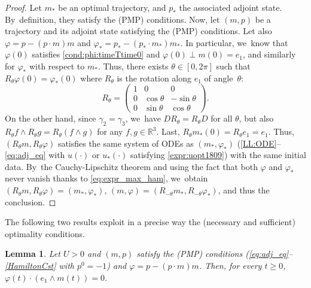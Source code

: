 \documentclass[JEP,XML,SOM,Unicode,NoEqCountersInSection,NoFloatCountersInSection,published]{cedram}
\newtheorem{lemma}[theorem]{Lemma}
\theoremstyle{definition}
\begin{document}
\begin{proof}
Let $m_*$ be an optimal trajectory, and $p_*$ the associated adjoint state. By~definition, they satisfy the (PMP) conditions. Now, let $(m, p)$ be a trajectory and its adjoint state satisfying the (PMP) conditions. Let also $\varphi = p - (p \cdot m) m$ and $\varphi_* = p_* - (p_* \cdot m_*) m_*$. In particular, we~know that $\varphi (0)$ satisfies \eqref{cond:phi:timeTtime0} and $\varphi (0) \perp m (0) = e_1$, and similarly for $\varphi_*$ with respect to $m_*$. Thus, there exists $\theta \in [0, 2 \pi]$ such that $R_\theta \varphi (0) = \varphi_* (0)$ where $R_\theta$ is the rotation along $e_1$ of angle~$\theta$:
\begin{equation*}
R_\theta =
\begin{pmatrix}
1 & 0 & 0 \\
0 & \cos \theta & - \sin \theta \\
0 & \sin \theta & \cos \theta
\end{pmatrix}.
\end{equation*}
On the other hand, since $\gamma_2 = \gamma_3$, we~have $D R_\theta = R_\theta D$ for all $\theta$, but also $R_\theta f \wedge R_\theta g = R_\theta (f \wedge g)$ for any $f, g \in \mathbb{R}^3$. Last, $R_\theta m_* (0) = R_\theta e_1 = e_1$. Thus, $(R_\theta m, R_\theta \varphi)$ satisfies the same system of ODEs as $(m_*, \varphi_*)$ (\ie \eqref{LL:ODE}--\eqref{eq:adj_eq} with $u (\cdot)$ or $u_* (\cdot)$ satisfying \eqref{expr:uopt1809}) with the same initial data. By~the Cauchy-Lipschitz theorem and using the fact that both $\varphi$ and $\varphi_*$ never vanish thanks to \eqref{eq:expr_max_ham}, we~obtain $(R_\theta m, R_\theta \varphi) = (m_*, \varphi_*)$, \ie $(m, \varphi) = (R_{- \theta} m_*, R_{- \theta} \varphi_*)$, and thus the conclusion.
\end{proof}

The following two results exploit in a precise way the (necessary and sufficient) optimality conditions.

\begin{lemma} \label{lem:adjoint_dir}
Let $U > 0$ and $(m, p)$ satisfy the (PMP) conditions (\eqref{eq:adj_eq}--\eqref{HamiltonCst} with $p^0 = -1$) and $\varphi = p - (p \cdot m) m$. Then, for every $t \geq 0$, $\varphi (t) \cdot (e_1 \wedge m (t)) = 0$.
\end{lemma}
\end{document}
